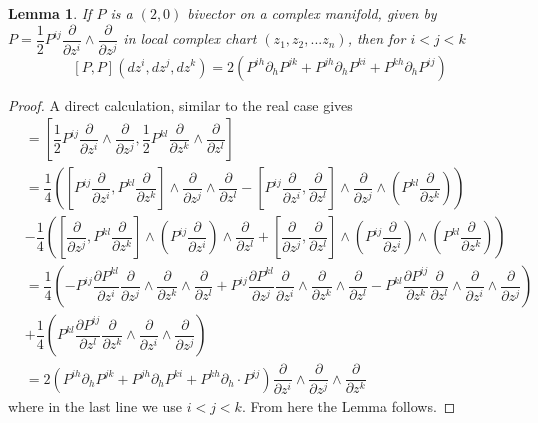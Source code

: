 \documentclass[11pt,oneside,leqno]{amsart}
\theoremstyle{plain}
\newtheorem{lemma}[theorem]{Lemma}
\theoremstyle{definition}
\begin{document}
\begin{lemma}\label{L1}
If $P$ is a $(2,0)$ bivector on a complex manifold, given by $P = \dfrac{1}{2} P^{ij} {\dfrac{\partial}{\partial z^i}} \wedge {\dfrac{\partial}{\partial z^j}}$ in local complex chart $(z_1,z_2,...z_n)$, then for $i<j<k$  $$[P,P](dz^i,dz^j,dz^k) = 2\left(P^{ih}\partial_h P^{jk} + P^{jh}\partial_h P^{ki}+P^{kh}\partial_h P^{ij}\right)$$
\end{lemma}
\begin{proof}

A direct calculation, similar to the real case gives
\begin{align*}
[P,P] &= \left[\dfrac{1}{2} P^{ij} {\dfrac{\partial}{\partial z^i}} \wedge {\dfrac{\partial}{\partial z^j}}, \dfrac{1}{2} P^{kl} {\dfrac{\partial}{\partial z^k}} \wedge {\dfrac{\partial}{\partial z^l}}\right]\\
                                &=\dfrac{1}{4}\left(\left[P^{ij} {\dfrac{\partial}{\partial z^i}}, P^{kl} {\dfrac{\partial}{\partial z^k}}\right] \wedge {\dfrac{\partial}{\partial z^j}} \wedge {\dfrac{\partial}{\partial z^l}} - \left[P^{ij} {\dfrac{\partial}{\partial z^i}}, {\dfrac{\partial}{\partial z^l}}\right] \wedge {\dfrac{\partial}{\partial z^j}} \wedge \left(P^{kl}{\dfrac{\partial}{\partial z^k}}\right) \right)
                                \\&-\dfrac{1}{4}\left(\left[{\dfrac{\partial}{\partial z^j}}, P^{kl} {\dfrac{\partial}{\partial z^k}}\right] \wedge \left(P^{ij}{\dfrac{\partial}{\partial z^i}}\right) \wedge {\dfrac{\partial}{\partial z^l}} + \left[{\dfrac{\partial}{\partial z^j}}, {\dfrac{\partial}{\partial z^l}}\right] \wedge \left(P^{ij} {\dfrac{\partial}{\partial z^i}}\right)\wedge \left(P^{kl}{\dfrac{\partial}{\partial z^k}}\right)\right)\\
                                &=\dfrac{1}{4}\left( - P^{ij} \dfrac{\partial P^{kl}}{\partial z^i} {\dfrac{\partial}{\partial z^j}} \wedge {\dfrac{\partial}{\partial z^k}} \wedge {\dfrac{\partial}{\partial z^l}} + P^{ij} \dfrac{\partial P^{kl}}{\partial z^j} {\dfrac{\partial}{\partial z^i}} \wedge {\dfrac{\partial}{\partial z^k}} \wedge {\dfrac{\partial}{\partial z^l}} - P^{kl} \dfrac{\partial P^{ij}}{\partial z^k} {\dfrac{\partial}{\partial z^l}} \wedge {\dfrac{\partial}{\partial z^i}} \wedge {\dfrac{\partial}{\partial z^j}} \right) \\
                                & +\dfrac{1}{4} \left(P^{kl} \dfrac{\partial P^{ij}}{\partial z^l}  {\dfrac{\partial}{\partial z^k}} \wedge {\dfrac{\partial}{\partial z^i}} \wedge {\dfrac{\partial}{\partial z^j}} \right)\\
                &=2\left(P^{ih}\partial_h P^{jk} + P^{jh}\partial_h P^{ki}+P^{kh}\partial_h\cdot P^{ij}\right) {\dfrac{\partial}{\partial z^i}}\wedge{\dfrac{\partial}{\partial z^j}}\wedge{\dfrac{\partial}{\partial z^k}}
\end{align*}
where in the last line we use $i<j<k$.
From here the Lemma follows.
\end{proof}
\end{document}
